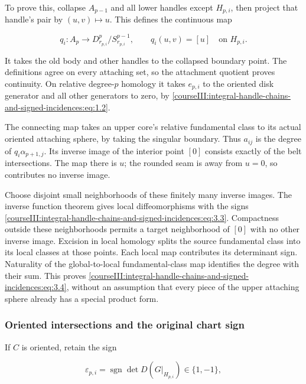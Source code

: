 To prove this, collapse \(A_{p-1}\) and all lower handles except \(H_{p,i}\), then project that handle's pair by \((u,v)\mapsto u\). This defines the continuous map

\begin{equation}
q_i:A_p\longrightarrow D^p_{r_{p,i}}/S^{p-1}_{r_{p,i}},
 \qquad q_i(u,v)=[u]\quad\text{on }H_{p,i}.
 \label{courseIII:integral-handle-chains-and-signed-incidences:eq:3.5}
\end{equation}

It takes the old body and other handles to the collapsed boundary point. The definitions agree on every attaching set, so the attachment quotient proves continuity. On relative degree-\(p\) homology it takes \(e_{p,i}\) to the oriented disk generator and all other generators to zero, by \eqref{courseIII:integral-handle-chains-and-signed-incidences:eq:1.2}.

The connecting map takes an upper core's relative fundamental class to its actual oriented attaching sphere, by taking the singular boundary. Thus \(a_{ij}\) is the degree of \(q_i\alpha_{p+1,j}\). Its inverse image of the interior point \([0]\) consists exactly of the belt intersections. The map there is \(u\); the rounded seam is away from \(u=0\), so contributes no inverse image.

Choose disjoint small neighborhoods of these finitely many inverse images. The inverse function theorem gives local diffeomorphisms with the signs \eqref{courseIII:integral-handle-chains-and-signed-incidences:eq:3.3}. Compactness outside these neighborhoods permits a target neighborhood of \([0]\) with no other inverse image. Excision in local homology splits the source fundamental class into its local classes at those points. Each local map contributes its determinant sign. Naturality of the global-to-local fundamental-class map identifies the degree with their sum. This proves \eqref{courseIII:integral-handle-chains-and-signed-incidences:eq:3.4}, without an assumption that every piece of the upper attaching sphere already has a special product form.

\subsubsection{Oriented intersections and the original chart sign}
\label{courseIII:integral-handle-chains-and-signed-incidences:section-3.1}

If \(C\) is oriented, retain the sign

\begin{equation}
\varepsilon_{p,i}=\operatorname{sgn}\det D(G|_{H_{p,i}})
 \in\{1,-1\},
 \label{courseIII:integral-handle-chains-and-signed-incidences:eq:3.6}
\end{equation}

